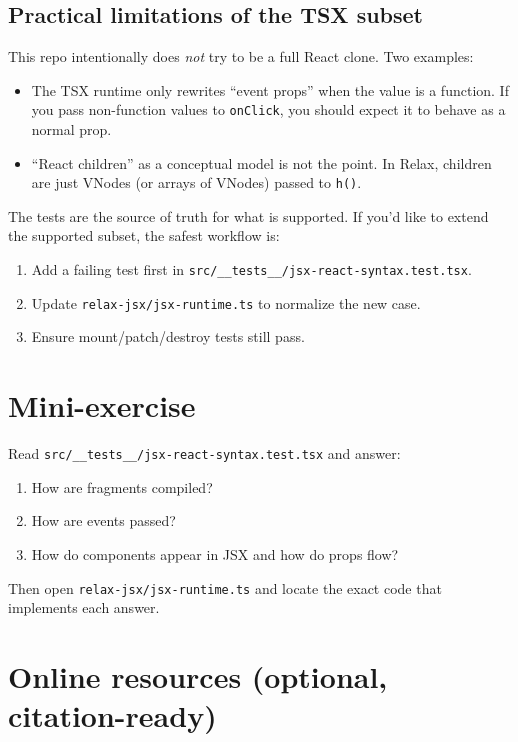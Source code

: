 \subsection{Practical limitations of the TSX subset}
This repo intentionally does \emph{not} try to be a full React clone.
Two examples:

\begin{itemize}
  \item The TSX runtime only rewrites ``event props'' when the value is a function.
    If you pass non-function values to \texttt{onClick}, you should expect it to behave as a normal prop.
  \item ``React children'' as a conceptual model is not the point.
    In Relax, children are just VNodes (or arrays of VNodes) passed to \texttt{h()}.
\end{itemize}

The tests are the source of truth for what is supported.
If you'd like to extend the supported subset, the safest workflow is:

\begin{enumerate}
  \item Add a failing test first in \texttt{src/\_\_tests\_\_/jsx-react-syntax.test.tsx}.
  \item Update \texttt{relax-jsx/jsx-runtime.ts} to normalize the new case.
  \item Ensure mount/patch/destroy tests still pass.
\end{enumerate}

\section{Mini-exercise}
Read \texttt{src/\_\_tests\_\_/jsx-react-syntax.test.tsx} and answer:

\begin{enumerate}
  \item How are fragments compiled?
  \item How are events passed?
  \item How do components appear in JSX and how do props flow?
\end{enumerate}

Then open \texttt{relax-jsx/jsx-runtime.ts} and locate the exact code that implements each answer.

\section{Online resources (optional, citation-ready)}

